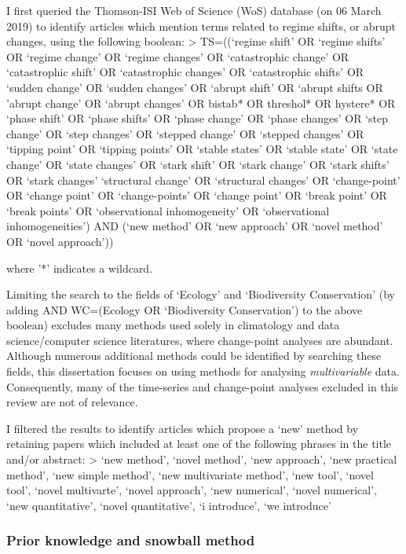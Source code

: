 \documentclass[12pt,twoside,openany]{reedthesis}
\begin{document}
I first queried the Thomson-ISI Web of Science (WoS) database (on 06
March 2019) to identify articles which mention terms related to regime
shifts, or abrupt changes, using the following boolean: \textgreater{}
TS=((`regime shift' OR `regime shifts' OR `regime change' OR `regime
changes' OR `catastrophic change' OR `catastrophic shift' OR
`catastrophic changes' OR `catastrophic shifts' OR `sudden change' OR
`sudden changes' OR `abrupt shift' OR `abrupt shifts OR 'abrupt change'
OR `abrupt changes' OR bistab* OR threshol* OR hystere* OR `phase shift'
OR `phase shifts' OR `phase change' OR `phase changes' OR `step change'
OR `step changes' OR `stepped change' OR `stepped changes' OR `tipping
point' OR `tipping points' OR `stable states' OR `stable state' OR
`state change' OR `state changes' OR `stark shift' OR `stark change' OR
`stark shifts' OR `stark changes' `structural change' OR `structural
changes' OR `change-point' OR `change point' OR `change-points' OR
`change point' OR `break point' OR `break points' OR `observational
inhomogeneity' OR `observational inhomogeneities') AND (`new method' OR
`new approach' OR `novel method' OR `novel approach'))

where '*' indicates a wildcard.

Limiting the search to the fields of `Ecology' and `Biodiversity
Conservation' (by adding AND WC=(Ecology OR `Biodiversity Conservation')
to the above boolean) excludes many methods used solely in climatology
and data science/computer science literatures, where change-point
analyses are abundant. Although numerous additional methods could be
identified by searching these fields, this dissertation focuses on using
methods for analysing \emph{multivariable} data. Consequently, many of
the time-series and change-point analyses excluded in this review are
not of relevance.

I filtered the results to identify articles which propose a `new' method
by retaining papers which included at least one of the following phrases
in the title and/or abstract: \textgreater{} `new method', `novel
method', `new approach', `new practical method', `new simple method',
`new multivariate method', `new tool', `novel tool', `novel multivarte',
`novel approach', `new numerical', `novel numerical', `new
quantitative', `novel quantitative', `i introduce', `we introduce'

\subsubsection{Prior knowledge and snowball
method}\label{prior-knowledge-and-snowball-method}
\end{document}
